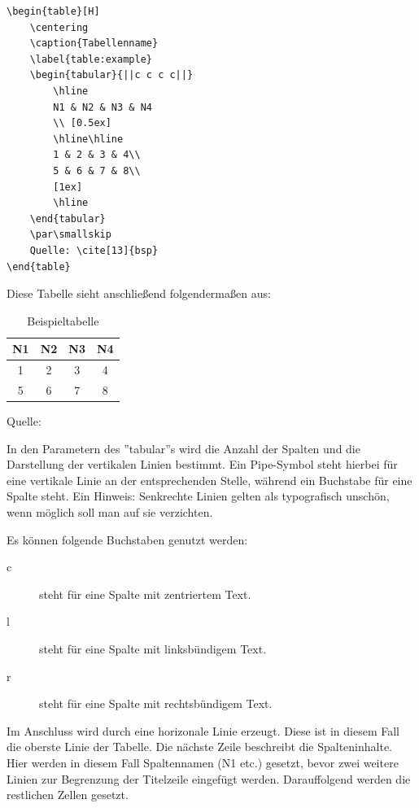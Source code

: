 \begin{lstlisting}
\begin{table}[H]
	\centering
	\caption{Tabellenname}
	\label{table:example}
	\begin{tabular}{||c c c c||}
		\hline
		N1 & N2 & N3 & N4
		\\ [0.5ex]
		\hline\hline
		1 & 2 & 3 & 4\\
		5 & 6 & 7 & 8\\
		[1ex]
		\hline
	\end{tabular}
	\par\smallskip 
	Quelle: \cite[13]{bsp}
\end{table}
\end{lstlisting}

Diese Tabelle sieht anschließend folgendermaßen aus:
\begin{table}[H]
	\centering
	\caption{Beispieltabelle}
	\label{table:example}
	\begin{tabular}{||c c c c||}
		\hline
		N1 & N2 & N3 & N4
		\\ [0.5ex]
		\hline\hline
		1 & 2 & 3 & 4\\
		5 & 6 & 7 & 8\\
		[1ex]
		\hline
	\end{tabular}
	\par\smallskip 
	Quelle: \cite[13]{bsp}
\end{table}

In den Parametern des ''tabular''s wird die Anzahl der Spalten und die Darstellung der vertikalen Linien bestimmt. 
Ein Pipe-Symbol steht hierbei für eine vertikale Linie an der entsprechenden Stelle, während ein Buchstabe für eine Spalte steht. 
Ein Hinweis: Senkrechte Linien gelten als typografisch unschön, wenn möglich soll man auf sie verzichten.

Es können folgende Buchstaben genutzt werden:
\begin{description}
	\item[c] steht für eine Spalte mit zentriertem Text.
	\item[l] steht für eine Spalte mit linksbündigem Text.
	\item[r] steht für eine Spalte mit rechtsbündigem Text.
\end{description}

Im Anschluss wird durch \befehl{\hline} eine horizonale Linie erzeugt. 
Diese ist in diesem Fall die oberste Linie der Tabelle. 
Die nächste Zeile beschreibt die Spalteninhalte. 
Hier werden in diesem Fall Spaltennamen (N1 etc.) gesetzt, bevor zwei weitere Linien zur Begrenzung der Titelzeile eingefügt werden. 
Darauffolgend werden die restlichen Zellen gesetzt.